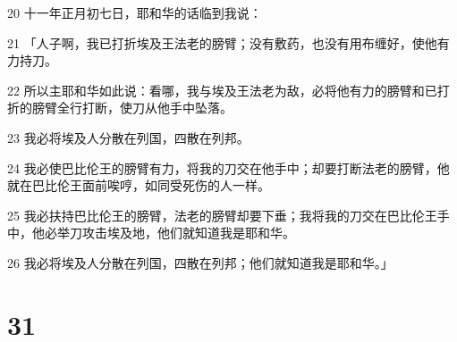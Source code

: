 \par 20 十一年正月初七日，耶和华的话临到我说：
\par 21 「人子啊，我已打折埃及王法老的膀臂；没有敷药，也没有用布缠好，使他有力持刀。
\par 22 所以主耶和华如此说：看哪，我与埃及王法老为敌，必将他有力的膀臂和已打折的膀臂全行打断，使刀从他手中坠落。
\par 23 我必将埃及人分散在列国，四散在列邦。
\par 24 我必使巴比伦王的膀臂有力，将我的刀交在他手中；却要打断法老的膀臂，他就在巴比伦王面前唉哼，如同受死伤的人一样。
\par 25 我必扶持巴比伦王的膀臂，法老的膀臂却要下垂；我将我的刀交在巴比伦王手中，他必举刀攻击埃及地，他们就知道我是耶和华。
\par 26 我必将埃及人分散在列国，四散在列邦；他们就知道我是耶和华。」

\chapter{31}

